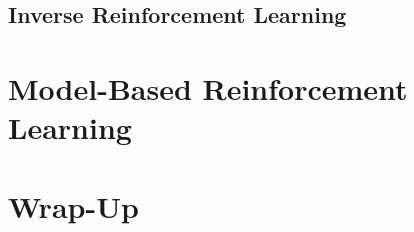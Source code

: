 		\subsection{Inverse Reinforcement Learning} %

	\section{Model-Based Reinforcement Learning} %

	\section{Wrap-Up} %
